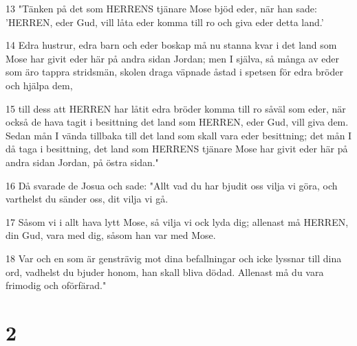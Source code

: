 \par 13 "Tänken på det som HERRENS tjänare Mose bjöd eder, när han sade: 'HERREN, eder Gud, vill låta eder komma till ro och giva eder detta land.'
\par 14 Edra hustrur, edra barn och eder boskap må nu stanna kvar i det land som Mose har givit eder här på andra sidan Jordan; men I själva, så många av eder som äro tappra stridsmän, skolen draga väpnade åstad i spetsen för edra bröder och hjälpa dem,
\par 15 till dess att HERREN har låtit edra bröder komma till ro såväl som eder, när också de hava tagit i besittning det land som HERREN, eder Gud, vill giva dem. Sedan mån I vända tillbaka till det land som skall vara eder besittning; det mån I då taga i besittning, det land som HERRENS tjänare Mose har givit eder här på andra sidan Jordan, på östra sidan."
\par 16 Då svarade de Josua och sade: "Allt vad du har bjudit oss vilja vi göra, och varthelst du sänder oss, dit vilja vi gå.
\par 17 Såsom vi i allt hava lytt Mose, så vilja vi ock lyda dig; allenast må HERREN, din Gud, vara med dig, såsom han var med Mose.
\par 18 Var och en som är gensträvig mot dina befallningar och icke lyssnar till dina ord, vadhelst du bjuder honom, han skall bliva dödad. Allenast må du vara frimodig och oförfärad."

\chapter{2}

